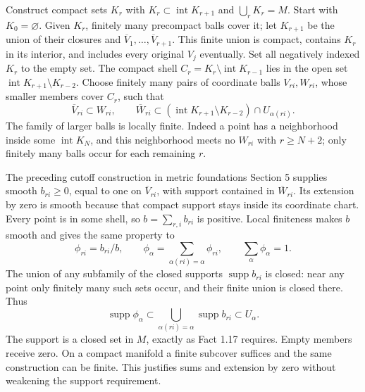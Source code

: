 \documentclass[
  11pt,
]{article}
\begin{document}
Construct compact sets \(K_r\) with
\(K_r\subset\operatorname{int}K_{r+1}\) and \(\bigcup_rK_r=M\). Start
with \(K_0=\varnothing\). Given \(K_r\), finitely many precompact balls
cover it; let \(K_{r+1}\) be the union of their closures and
\(\overline V_1,\ldots,\overline V_{r+1}\). This finite union is
compact, contains \(K_r\) in its interior, and includes every original
\(V_j\) eventually. Set all negatively indexed \(K_r\) to the empty set.
The compact shell \(C_r=K_r\setminus\operatorname{int}K_{r-1}\) lies in
the open set \(\operatorname{int}K_{r+1}\setminus K_{r-2}\). Choose
finitely many pairs of coordinate balls \(V_{ri},W_{ri}\), whose smaller
members cover \(C_r\), such that \[
 \overline V_{ri}\subset W_{ri},\qquad
 \overline W_{ri}\subset
 (\operatorname{int}K_{r+1}\setminus K_{r-2})\cap U_{\alpha(ri)}.
 \tag{P261.12}
\] The family of larger balls is locally finite. Indeed a point has a
neighborhood inside some \(\operatorname{int}K_N\), and this
neighborhood meets no \(W_{ri}\) with \(r\ge N+2\); only finitely many
balls occur for each remaining \(r\).

The preceding cutoff construction in metric foundations Section 5
supplies smooth \(b_{ri}\ge0\), equal to one on \(\overline V_{ri}\),
with support contained in \(\overline W_{ri}\). Its extension by zero is
smooth because that compact support stays inside its coordinate chart.
Every point is in some shell, so \(b=\sum_{r,i}b_{ri}\) is positive.
Local finiteness makes \(b\) smooth and gives the same property to \[
 \phi_{ri}=b_{ri}/b,\qquad
 \phi_\alpha=\sum_{\alpha(ri)=\alpha}\phi_{ri},\qquad
 \sum_\alpha\phi_\alpha=1.
 \tag{P261.13}
\] The union of any subfamily of the closed supports
\(\operatorname{supp}b_{ri}\) is closed: near any point only finitely
many such sets occur, and their finite union is closed there. Thus \[
 \operatorname{supp}\phi_\alpha\subset
 \bigcup_{\alpha(ri)=\alpha}\operatorname{supp}b_{ri}\subset U_\alpha.
\] The support is a closed set in \(M\), exactly as Fact 1.17 requires.
Empty members receive zero. On a compact manifold a finite subcover
suffices and the same construction can be finite. This justifies sums
and extension by zero without weakening the support requirement.
\end{document}
